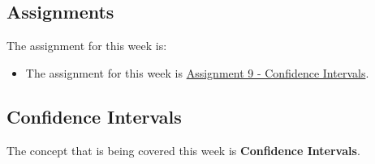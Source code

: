 \subsection{Assignments}

The assignment for this week is:

\begin{itemize}
    \item The assignment for this week is \href{https://github.com/QuantumCompiler/CU/tree/main/CSPB%203022%20-%20Introduction%20To%20Data%20Science%20With%20Probability%20And%20Statistics/CSPB%203022%20-%20Assignments/CSPB%203022%20-%20Assignment%209%20-%20Confidence%20Intervals}{Assignment 9 - Confidence Intervals}. 
\end{itemize}

\subsection{Confidence Intervals}

The concept that is being covered this week is \textbf{Confidence Intervals}.

